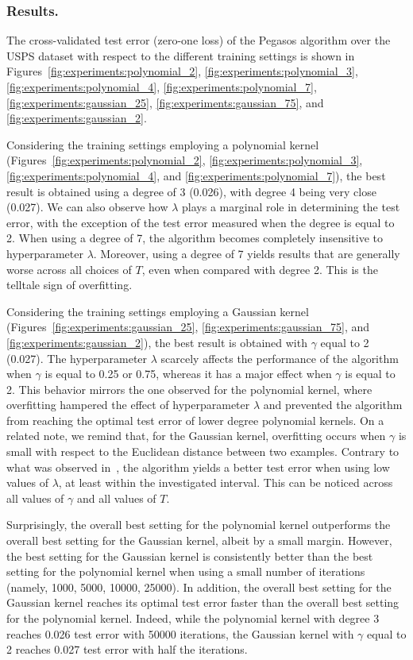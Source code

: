 \documentclass[runningheads]{llncs}
\begin{document}
\subsubsection{Results.} The cross-validated test error (zero-one loss) of the Pegasos algorithm over the USPS dataset with respect to the different training settings is shown in Figures~\ref{fig:experiments:polynomial_2}, \ref{fig:experiments:polynomial_3}, \ref{fig:experiments:polynomial_4}, \ref{fig:experiments:polynomial_7}, \ref{fig:experiments:gaussian_25}, \ref{fig:experiments:gaussian_75}, and \ref{fig:experiments:gaussian_2}.

Considering the training settings employing a polynomial kernel (Figures~\ref{fig:experiments:polynomial_2}, \ref{fig:experiments:polynomial_3}, \ref{fig:experiments:polynomial_4}, and \ref{fig:experiments:polynomial_7}), the best result is obtained using a degree of 3 (0.026), with degree 4 being very close (0.027). We can also observe how $\lambda$ plays a marginal role in determining the test error, with the exception of the test error measured when the degree is equal to 2. When using a degree of 7, the algorithm becomes completely insensitive to hyperparameter $\lambda$. Moreover, using a degree of 7 yields results that are generally worse across all choices of $T$, even when compared with degree 2. This is the telltale sign of overfitting.

Considering the training settings employing a Gaussian kernel (Figures~\ref{fig:experiments:gaussian_25}, \ref{fig:experiments:gaussian_75}, and \ref{fig:experiments:gaussian_2}), the best result is obtained with $\gamma$ equal to 2 (0.027). The hyperparameter $\lambda$ scarcely affects the performance of the algorithm when $\gamma$ is equal to 0.25 or 0.75, whereas it has a major effect when $\gamma$ is equal to 2. This behavior mirrors the one observed for the polynomial kernel, where overfitting hampered the effect of hyperparameter $\lambda$ and prevented the algorithm from reaching the optimal test error of lower degree polynomial kernels. On a related note, we remind that, for the Gaussian kernel, overfitting occurs when $\gamma$ is small with respect to the Euclidean distance between two examples. Contrary to what was observed in~\cite{shalev-pegasos-2011}, the algorithm yields a better test error when using low values of $\lambda$, at least within the investigated interval. This can be noticed across all values of $\gamma$ and all values of $T$.

Surprisingly, the overall best setting for the polynomial kernel outperforms the overall best setting for the Gaussian kernel, albeit by a small margin. However, the best setting for the Gaussian kernel is consistently better than the best setting for the polynomial kernel when using a small number of iterations (namely, 1000, 5000, 10000, 25000). In addition, the overall best setting for the Gaussian kernel reaches its optimal test error faster than the overall best setting for the polynomial kernel. Indeed, while the polynomial kernel with degree 3 reaches 0.026 test error with 50000 iterations, the Gaussian kernel with $\gamma$ equal to 2 reaches 0.027 test error with half the iterations.
\end{document}
